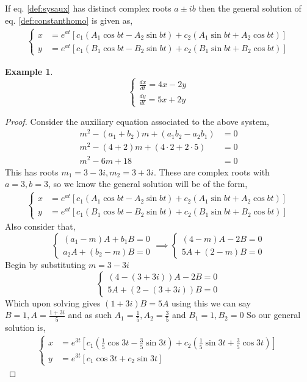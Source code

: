 \documentclass[oneside,11pt,pdftex,final]{book}%
\numberwithin{equation}{section}
\newtheorem{example}[theorem]{Example}
\numberwithin{section}{chapter}
\numberwithin{equation}{chapter}
\begin{document}
If eq. \ref{def:sysaux} has distinct complex roots $a\pm ib $ then the general solution of eq. \ref{def:constanthomo} is given as,
\begin{align*}
	\begin{cases}
		x&=e^{at}[c_1(A_1 \cos bt - A_2 \sin bt)+c_2(A_1 \sin bt + A_2 \cos bt)]\\
		y&=e^{at}[c_1(B_1 \cos bt- B_2 \sin bt)+c_2(B_1 \sin bt + B_2 \cos bt)]
	\end{cases}
\end{align*}

\begin{example}
	\[ \begin{cases}
		\frac{dx}{dt}=4x-2y\\
		\frac{dy}{dt}=5x+2y
	\end{cases} \]
\end{example}
\begin{proof}
	Consider the auxiliary equation associated to the above system,
	\begin{align*}
		m^2-(a_1+b_2)m+(a_1b_2-a_2b_1)&=0\\
		m^2-(4+2)m+(4\cdot2+2\cdot5)&=0\\
		m^2-6m+18&=0
	\end{align*}
	This has roots $ m_1=3-3i,m_2=3+3i $. These are complex roots with $ a=3,b=3 $, so we know the general solution will be of the form,
	\begin{align*}
		\begin{cases}
			x&=e^{at}[c_1(A_1 \cos bt - A_2 \sin bt)+c_2(A_1 \sin bt + A_2 \cos bt)]\\
			y&=e^{at}[c_1(B_1 \cos bt- B_2 \sin bt)+c_2(B_1 \sin bt + B_2 \cos bt)]
		\end{cases}
	\end{align*}
	Also consider that,
	\[ \begin{cases}
		(a_1-m)A+b_1B=0\\
		a_2A+(b_2-m)B=0
	\end{cases} \implies 
	\begin{cases}
		(4-m)A-2B=0\\
		5A+(2-m)B=0
	\end{cases}\]
	Begin by substituting $ m=3-3i $
	\[ \begin{cases}
			(4-(3+3i))A-2B=0\\
			5A+(2-(3+3i))B=0
	\end{cases} \]
	Which upon solving gives $ (1+3i)B=5A $ using this we can say $ B=1, A=\frac{1+3i}{5} $ and as such $ A_1=\frac{1}{5}, A_2=\frac{3}{5} $ and $ B_1=1,B_2=0 $
	So our general solution is,
	\begin{align*}
		\begin{cases}
			x&=e^{3t}[c_1\left(\frac{1}{5} \cos 3t - \frac{3}{5} \sin 3t\right)+c_2\left(\frac{1}{5} \sin 3t + \frac{3}{5} \cos 3t\right)]\\
			y&=e^{3t}[c_1 \cos 3t+c_2\sin 3t]
		\end{cases}
	\end{align*}
\end{proof}
\end{document}
